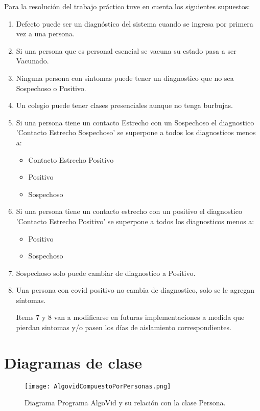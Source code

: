 \documentclass[titlepage,a4paper]{article}
\begin{document}
Para la resolución del trabajo práctico tuve en cuenta los siguientes supuestos:
\begin{enumerate}
  \item Defecto puede ser un diagnóstico del sistema cuando se ingresa por primera vez a una persona.
  \item Si una persona que es personal esencial se vacuna su estado pasa a ser Vacunado.
  \item Ninguna persona con sintomas puede tener un diagnostico que no sea Sospechoso o Positivo.
  \item Un colegio puede tener clases presenciales aunque no tenga burbujas.
  \item Si una persona tiene un contacto Estrecho con un Sospechoso el diagnostico 'Contacto Estrecho Sospechoso' se superpone a todos los diagnosticos menos a:
  \begin{itemize}
      \item Contacto Estrecho Positivo
      \item Positivo
      \item Sospechoso
  \end{itemize}
  \item Si una persona tiene un contacto estrecho con un positivo el diagnostico 'Contacto Estrecho Positivo' se superpone a todos los diagnosticos menos a:
    \begin{itemize}
      \item Positivo
      \item Sospechoso
  \end{itemize}
  \item Sospechoso solo puede cambiar de diagnostico a Positivo.
  \item Una persona con covid positivo no cambia de diagnostico, solo se le agregan síntomas.
  
  Items 7 y 8 van a modificarse en futuras implementaciones a medida que pierdan sintomas y/o pasen los días de aislamiento correspondientes.
  
   
\end{enumerate}






\section{Diagramas de clase}\label{sec:diagramasdeclase}


\begin{figure}[H]
\centering
\texttt{[image: AlgovidCompuestoPorPersonas.png]}
\caption{\label{fig:class01}Diagrama Programa AlgoVid y su relación con la clase Persona.}
\end{figure}
\end{document}
